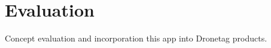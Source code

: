 \chapter{Evaluation}\label{ch:evaluation}
Concept evaluation and incorporation this app into Dronetag products.